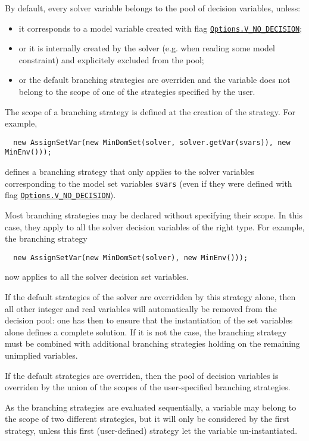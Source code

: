 By default, every solver variable belongs to the pool of decision variables, unless:
\begin{itemize}
\item it corresponds to a model variable created with flag \hyperlink{vnodecision:vnodecisionoptions}{\tt Options.V\_NO\_DECISION};
\item or it is internally created by the solver (e.g. when reading some model constraint) and explicitely excluded from the pool;
\item or the default branching strategies are overriden and the variable does not belong to the scope of one of the strategies specified by the user.
\end{itemize}

The scope of a branching strategy is defined at the creation of the strategy. For example,
\begin{lstlisting}
  new AssignSetVar(new MinDomSet(solver, solver.getVar(svars)), new MinEnv()));
\end{lstlisting}
defines a branching strategy that only applies to the solver variables corresponding to the model set variables \texttt{svars} (even if they were defined with flag \hyperlink{vnodecision:vnodecisionoptions}{\tt Options.V\_NO\_DECISION}).

Most branching strategies may be declared without specifying their scope. In this case, they apply to all the solver decision variables of the right type. For example, the branching strategy
\begin{lstlisting}
  new AssignSetVar(new MinDomSet(solver), new MinEnv()));
\end{lstlisting}
now applies to all the solver decision set variables.

If the default strategies of the solver are overridden by this strategy alone, then all other integer and real variables will automatically be removed from the decision pool: one has then to ensure that the instantiation of the set variables alone defines a complete solution.
If it is not the case, the branching strategy must be combined with additional branching strategies holding on the remaining unimplied variables.
\begin{note}
  If the default strategies are overriden, then the pool of decision variables is overriden by the union of the scopes of the user-specified branching strategies.
\end{note}
As the branching strategies are evaluated sequentially, a variable may belong to the scope of two different strategies, but it will only be considered by the first strategy, unless this first (user-defined) strategy let the variable un-instantiated.

